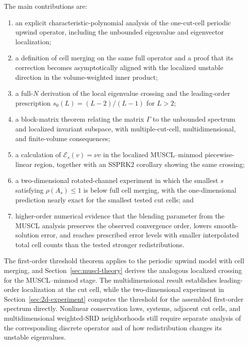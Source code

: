 \documentclass[preprint,12pt]{elsarticle}
\begin{document}
The main contributions are:
\begin{enumerate}
    \item an explicit characteristic-polynomial analysis of the one-cut-cell
    periodic upwind operator, including the unbounded eigenvalue and
    eigenvector localization;
    \item a definition of cell merging on the same full operator and a proof
    that its correction becomes asymptotically aligned with the localized
    unstable direction in the volume-weighted inner product;
    \item a full-$N$ derivation of the local eigenvalue crossing and the
    leading-order prescription $s_0(L)=(L-2)/(L-1)$ for $L>2$;
    \item a block-matrix theorem relating the matrix $\Gamma$ to the unbounded spectrum and localized invariant subspace, with
    multiple-cut-cell, multidimensional, and finite-volume consequences;
    \item a calculation of $\mathcal E_s(v)=\nu v$ in the localized MUSCL--minmod
    piecewise-linear region, together with an SSPRK2 corollary showing the same crossing;
    \item a two-dimensional rotated-channel experiment in which the smallest
    $s$ satisfying $\rho(A_s)\le1$ is below full cell merging, with the
    one-dimensional prediction nearly exact for the smallest tested cut cells;
    and
    \item higher-order numerical evidence that the blending parameter from
    the MUSCL analysis preserves the observed convergence order, lowers
    smooth-solution error, and reaches prescribed error levels with smaller
    interpolated total cell counts than the tested stronger redistributions.
\end{enumerate}

The first-order threshold theorem applies to the periodic upwind model with
cell merging, and Section~\ref{sec:muscl-theory} derives the analogous
localized crossing for the MUSCL--minmod stage.  The multidimensional result
establishes leading-order localization at the cut cell, while the two-dimensional
experiment in Section~\ref{sec:2d-experiment} computes the threshold for the assembled
first-order spectrum directly.  Nonlinear conservation laws, systems, adjacent cut cells, and
multidimensional weighted-SRD neighborhoods still require separate analysis
of the corresponding discrete operator and of how redistribution changes its
unstable eigenvalues.
\end{document}
